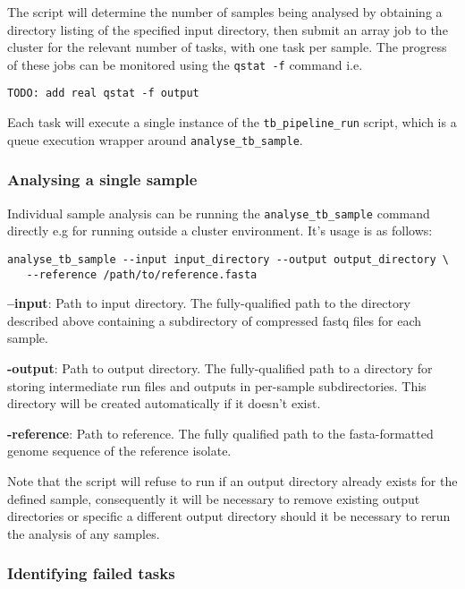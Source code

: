 \documentclass[a4paper,10pt,twoside]{article}
\newenvironment{tight_itemize}{
\begin{itemize}
  \setlength{\itemsep}{0pt}
  \setlength{\parskip}{0pt}
}{\end{itemize}}
\begin{document}
The script will determine the number of samples being analysed by obtaining a
directory listing of the specified input directory, then submit an array job to
the cluster for the relevant number of tasks, with one task per sample. The
progress of these jobs can be monitored using the {\tt qstat -f} command i.e. 

\begin{verbatim}
TODO: add real qstat -f output
\end{verbatim}

Each task will execute a single instance of the {\tt tb\_pipeline\_run} script,
which is a queue execution wrapper around {\tt analyse\_tb\_sample}.

\subsubsection {Analysing a single sample}

Individual sample analysis can be running the {\tt analyse\_tb\_sample} command
directly e.g for running outside a cluster environment. It's usage is as follows:

\begin{verbatim}
analyse_tb_sample --input input_directory --output output_directory \
   --reference /path/to/reference.fasta
\end{verbatim}

\begin{tight_itemize}
\item \textbf{--input}: Path to input directory. The fully-qualified path to
the directory described above containing a subdirectory of compressed fastq
files for each sample.
 \item \textbf{-output}: Path to output directory. The fully-qualified path to a
directory for storing intermediate run files and outputs in per-sample
subdirectories. This directory will be created automatically if it doesn't
exist. 
\item \textbf{-reference}: Path to reference. The fully qualified path to the
fasta-formatted genome sequence of the reference isolate.
\end{tight_itemize}

Note that the script will refuse to run if an output directory already exists
for the defined sample, consequently it will be necessary to remove existing
output directories or specific a different output directory should it be
necessary to rerun the analysis of any samples. 

\subsubsection{Identifying failed tasks}
\end{document}
